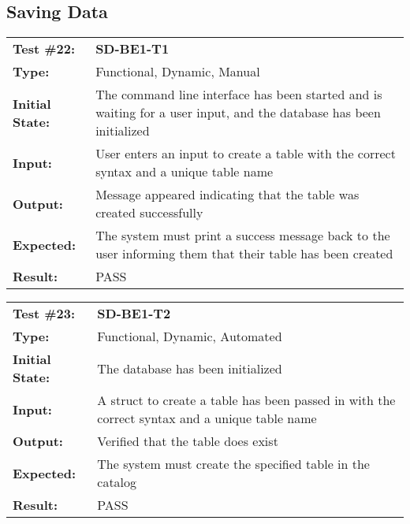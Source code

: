 \documentclass[12pt, titlepage]{article}
\begin{document}
\subsection{Saving Data}

\begin{mdframed}[linewidth=1pt]
\begin{tabularx}{\textwidth}{@{}p{3cm}X@{}}
{\bf Test \#22:} & {\bf SD-BE1-T1}\\[\baselineskip]
{\bf Type:} & Functional, Dynamic, Manual \\[0.5\baselineskip]
{\bf Initial State:} & The command line interface has been started and is waiting for a user input, and the database has been initialized \\[\baselineskip]
{\bf Input:} & User enters an input to create a table with the correct syntax and a unique table name \\[\baselineskip]
{\bf Output:} & Message appeared indicating that the table was created successfully \\[\baselineskip]
{\bf Expected:} & The system must print a success message back to the user informing them that their table has been created \\[\baselineskip]
{\bf Result:} & PASS
\end{tabularx}
\end{mdframed}

\begin{mdframed}[linewidth=1pt]
\begin{tabularx}{\textwidth}{@{}p{3cm}X@{}}
{\bf Test \#23:} & {\bf SD-BE1-T2}\\[\baselineskip]
{\bf Type:} & Functional, Dynamic, Automated \\[0.5\baselineskip]
{\bf Initial State:} & The database has been initialized \\[\baselineskip]
{\bf Input:} & A struct to create a table has been passed in with the correct syntax and a unique table name \\[\baselineskip]
{\bf Output:} & Verified that the table does exist \\[\baselineskip]
{\bf Expected:} & The system must create the specified table in the catalog \\[\baselineskip]
{\bf Result:} & PASS
\end{tabularx}
\end{mdframed}
\end{document}
